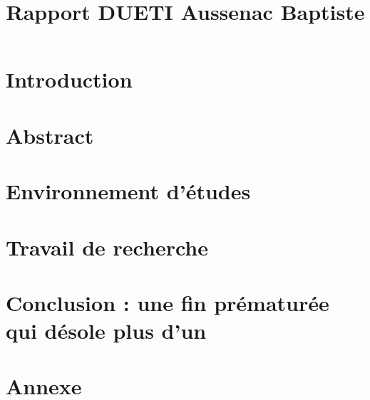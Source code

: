 \documentclass{rapportDUETI}
\title{Rapport DUETI Aussenac Baptiste} %
\begin{document}




        
\fairemarges %
\fairepagedegarde %
\tabledematieres %




\section{Introduction} 



\newpage

\section{Abstract} 



\newpage

\section{Environnement d'études}


\newpage

\section{Travail de recherche}


\newpage

\section{Conclusion : une fin prématurée qui désole plus d'un}


\newpage

\section{Annexe}


\end{document}
